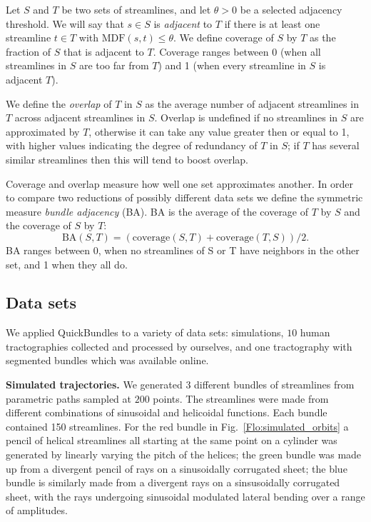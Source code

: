 \documentclass{bioinfo}
\begin{document}
\begin{methods}
Let $S$ and $T$ be two sets of streamlines, and let $\theta>0$ be a
selected adjacency threshold. We will say that $s \in S$ is
\emph{adjacent} to $T$ if there is at least one streamline
$t \in T$ with $\mathrm{MDF}(s,t)\le \theta$. We define coverage of $S$
by $T$ as the fraction of $S$ that is adjacent to $T$. Coverage
ranges between 0 (when all streamlines in $S$ are too far from $T$) and
1 (when every streamline in $S$ is adjacent $T$).

We define the \emph{overlap} of $T$ in $S$ as the average number of
adjacent streamlines in $T$ across adjacent streamlines in $S$.  Overlap
is undefined if no streamlines in $S$ are approximated by $T$, otherwise
it can take any value greater then or equal to 1, with higher values
indicating the degree of redundancy of $T$ in $S$; if $T$ has several
similar streamlines then this will tend to boost overlap.

Coverage and overlap measure how well one set approximates another. In
order to compare two reductions of possibly different data sets we
define the symmetric measure \emph{bundle adjacency} (BA).  BA is the
average of the coverage of $T$ by $S$ and the coverage of $S$ by
$T$: $$\mathrm{BA}(S,T) = (\mathrm{coverage}(S,T) +
\mathrm{coverage}(T,S))/2.$$ BA ranges between 0, when no streamlines of
S or T have neighbors in the other set, and 1 when they all do.

\subsection{\label{sub:QB-Data-sets}Data sets}

We applied QuickBundles to a variety of data sets: simulations, $10$
human tractographies collected and processed by ourselves, and one
tractography with segmented bundles which was available online.

\textbf{Simulated trajectories.} We generated $3$ different bundles of streamlines from
parametric paths sampled at $200$ points. The streamlines were made from
different combinations of sinusoidal and helicoidal functions.  Each
bundle contained 150 streamlines.  For the red bundle in
Fig.~\ref{Flo:simulated_orbits} a pencil of helical streamlines all
starting at the same point on a cylinder was generated by linearly
varying the pitch of the helices; the green bundle was made up from a
divergent pencil of rays on a sinusoidally corrugated sheet; the blue
bundle is similarly made from a divergent rays on a sinsusoidally
corrugated sheet, with the rays undergoing sinusoidal modulated lateral
bending over a range of amplitudes.


\end{methods}
\end{document}
